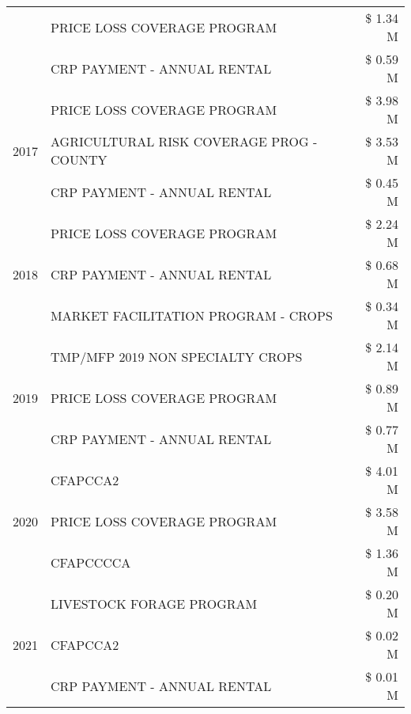 \begin{tabular}{llr}
 & PRICE LOSS COVERAGE PROGRAM                   & \$ 1.34 M \\
 & CRP PAYMENT - ANNUAL RENTAL                   & \$ 0.59 M \\
\cline{1-3}
\multirow[t]{3}{*}{2017} & PRICE LOSS COVERAGE PROGRAM & \$ 3.98 M \\
 & AGRICULTURAL RISK COVERAGE PROG - COUNTY & \$ 3.53 M \\
 & CRP PAYMENT - ANNUAL RENTAL & \$ 0.45 M \\
\cline{1-3}
\multirow[t]{3}{*}{2018} & PRICE LOSS COVERAGE PROGRAM & \$ 2.24 M \\
 & CRP PAYMENT - ANNUAL RENTAL & \$ 0.68 M \\
 & MARKET FACILITATION PROGRAM - CROPS & \$ 0.34 M \\
\cline{1-3}
\multirow[t]{3}{*}{2019} & TMP/MFP 2019 NON SPECIALTY CROPS & \$ 2.14 M \\
 & PRICE LOSS COVERAGE PROGRAM & \$ 0.89 M \\
 & CRP PAYMENT - ANNUAL RENTAL & \$ 0.77 M \\
\cline{1-3}
\multirow[t]{3}{*}{2020} & CFAPCCA2 & \$ 4.01 M \\
 & PRICE LOSS COVERAGE PROGRAM & \$ 3.58 M \\
 & CFAPCCCCA & \$ 1.36 M \\
\cline{1-3}
\multirow[t]{3}{*}{2021} & LIVESTOCK FORAGE PROGRAM & \$ 0.20 M \\
 & CFAPCCA2 & \$ 0.02 M \\
 & CRP PAYMENT - ANNUAL RENTAL & \$ 0.01 M \\
\cline{1-3}
\bottomrule
\end{tabular}

